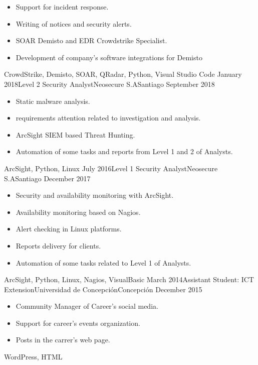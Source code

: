 \begin{experiences}
{\begin{itemize}
        \item Support for incident response.                   
        \item Writing of notices and security alerts.                          
        \item SOAR Demisto and EDR Crowdstrike Specialist.                      
        \item Development of company's software integrations for Demisto                                
      \end{itemize}
    }{CrowdStrike, Demisto, SOAR, QRadar, Python, Visual Studio Code}
  \emptySeparator
  \experience
  {January 2018}{Level 2 Security Analyst}{Neosecure S.A}{Santiago}
  {September 2018}{
    \begin{itemize}
      \item Static malware analysis.
      \item requirements attention related to investigation and analysis.
      \item ArcSight SIEM based Threat Hunting.
      \item Automation of some tasks and reports from Level 1 and 2 of Analysts.
    \end{itemize}
  }{ArcSight, Python, Linux}
  \emptySeparator
  \experience
  {July 2016}{Level 1 Security Analyst}{Neosecure S.A}{Santiago}
  {December 2017}{
    \begin{itemize}
      \item Security and availability monitoring with ArcSight.
      \item Availability monitoring based on Nagios.
      \item Alert checking in Linux platforms.
      \item Reports delivery for clients.
      \item Automation of some tasks related to Level 1 of Analysts.
    \end{itemize}
  }{ArcSight, Python, Linux, Nagios, VisualBasic}
  \emptySeparator
  \experience
  {March 2014}{Assistant Student: ICT Extension}{Universidad de Concepción}{Concepción}
  {December 2015}{
    \begin{itemize}
      \item Community Manager of Career's social media.
      \item Support for career's events organization.
      \item Posts in the carrer's web page.
    \end{itemize}
  }{WordPress, HTML}
  \emptySeparator

\end{experiences}
